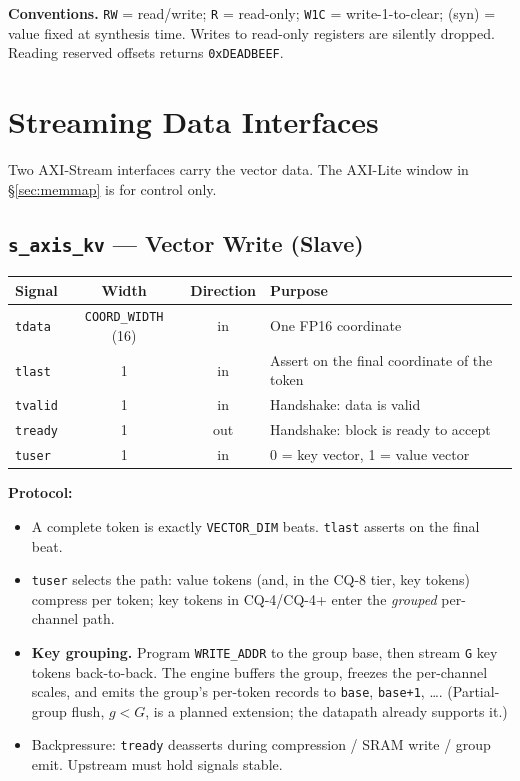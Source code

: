\documentclass[11pt]{article}
\begin{document}
\medskip
\noindent\textbf{Conventions.} \texttt{RW} = read/write; \texttt{R} = read-only;
\texttt{W1C} = write-1-to-clear; (syn) = value fixed at synthesis time.
Writes to read-only registers are silently dropped. Reading reserved offsets
returns \texttt{0xDEADBEEF}.

\section{Streaming Data Interfaces}
\label{sec:stream}

Two AXI-Stream interfaces carry the vector data. The AXI-Lite window in
\S\ref{sec:memmap} is for control only.

\subsection{\texttt{s\_axis\_kv} --- Vector Write (Slave)}
\label{sec:s_axis_kv}

\begin{table}[h]
\centering
\small
\begin{tabular}{@{}l c c p{8cm}@{}}
\toprule
Signal      & Width                  & Direction & Purpose \\
\midrule
\texttt{tdata}  & \texttt{COORD\_WIDTH} (16) & in    & One FP16 coordinate \\
\texttt{tlast}  & 1                     & in        & Assert on the final coordinate of the token \\
\texttt{tvalid} & 1                     & in        & Handshake: data is valid \\
\texttt{tready} & 1                     & out       & Handshake: block is ready to accept \\
\texttt{tuser}  & 1                     & in        & 0 = key vector, 1 = value vector \\
\bottomrule
\end{tabular}
\end{table}

\noindent\textbf{Protocol:}
\begin{itemize}
\item A complete token is exactly \texttt{VECTOR\_DIM} beats. \texttt{tlast}
  asserts on the final beat.
\item \texttt{tuser} selects the path: value tokens (and, in the CQ-8 tier, key
  tokens) compress per token; key tokens in CQ-4/CQ-4+ enter the \emph{grouped}
  per-channel path.
\item \textbf{Key grouping.} Program \texttt{WRITE\_ADDR} to the group base, then
  stream \texttt{G} key tokens back-to-back. The engine buffers the group, freezes
  the per-channel scales, and emits the group's per-token records to
  \texttt{base}, \texttt{base+1}, \dots. (Partial-group flush, $g<G$, is a
  planned extension; the datapath already supports it.)
\item Backpressure: \texttt{tready} deasserts during compression / SRAM write /
  group emit. Upstream must hold signals stable.
\end{itemize}
\end{document}
